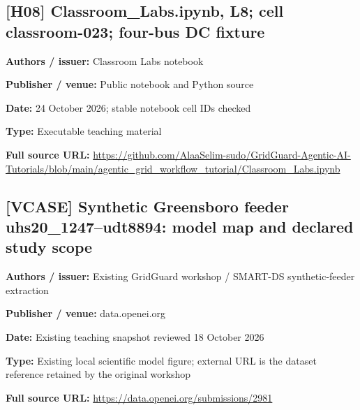 \documentclass[10pt,letterpaper]{article}
\begin{document}
\subsection*{[H08] Classroom\_Labs.ipynb, L8; cell classroom-023; four-bus DC fixture}
\textbf{Authors / issuer:} Classroom Labs notebook\par
\textbf{Publisher / venue:} Public notebook and Python source\par
\textbf{Date:} 24 October 2026; stable notebook cell IDs checked\par
\textbf{Type:} Executable teaching material\par
\textbf{Full source URL:} \href{https://github.com/AlaaSelim-sudo/GridGuard-Agentic-AI-Tutorials/blob/main/agentic_grid_workflow_tutorial/Classroom_Labs.ipynb}{\small\ttfamily https:/\allowbreak{}/\allowbreak{}github.\allowbreak{}com/\allowbreak{}AlaaSelim-\allowbreak{}sudo/\allowbreak{}GridGuard-\allowbreak{}Agentic-\allowbreak{}AI-\allowbreak{}Tutorials/\allowbreak{}blob/\allowbreak{}main/\allowbreak{}agentic\_\allowbreak{}grid\_\allowbreak{}workflow\_\allowbreak{}tutorial/\allowbreak{}Classroom\_\allowbreak{}Labs.\allowbreak{}ipynb}\par
\par\medskip
\subsection*{[VCASE] Synthetic Greensboro feeder uhs20\_1247--udt8894: model map and declared study scope}
\textbf{Authors / issuer:} Existing GridGuard workshop / SMART-DS synthetic-feeder extraction\par
\textbf{Publisher / venue:} data.openei.org\par
\textbf{Date:} Existing teaching snapshot reviewed 18 October 2026\par
\textbf{Type:} Existing local scientific model figure; external URL is the dataset reference retained by the original workshop\par
\textbf{Full source URL:} \href{https://data.openei.org/submissions/2981}{\small\ttfamily https:/\allowbreak{}/\allowbreak{}data.\allowbreak{}openei.\allowbreak{}org/\allowbreak{}submissions/\allowbreak{}2981}\par
\par\medskip
\end{document}
